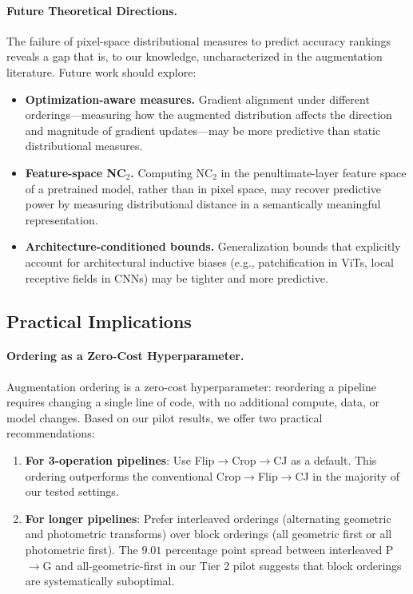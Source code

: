 \documentclass{article}
\begin{document}
\paragraph{Future Theoretical Directions.}
The failure of pixel-space distributional measures to predict accuracy rankings reveals a gap that is, to our knowledge, uncharacterized in the augmentation literature. Future work should explore:
\begin{itemize}
\item \textbf{Optimization-aware measures.} Gradient alignment under different orderings---measuring how the augmented distribution affects the direction and magnitude of gradient updates---may be more predictive than static distributional measures.
\item \textbf{Feature-space NC$_2$.} Computing NC$_2$ in the penultimate-layer feature space of a pretrained model, rather than in pixel space, may recover predictive power by measuring distributional distance in a semantically meaningful representation.
\item \textbf{Architecture-conditioned bounds.} Generalization bounds that explicitly account for architectural inductive biases (e.g., patchification in ViTs, local receptive fields in CNNs) may be tighter and more predictive.
\end{itemize}

\subsection{Practical Implications}

\paragraph{Ordering as a Zero-Cost Hyperparameter.}
Augmentation ordering is a zero-cost hyperparameter: reordering a pipeline requires changing a single line of code, with no additional compute, data, or model changes. Based on our pilot results, we offer two practical recommendations:
\begin{enumerate}
\item \textbf{For 3-operation pipelines}: Use Flip$\to$Crop$\to$CJ as a default. This ordering outperforms the conventional Crop$\to$Flip$\to$CJ in the majority of our tested settings.
\item \textbf{For longer pipelines}: Prefer interleaved orderings (alternating geometric and photometric transforms) over block orderings (all geometric first or all photometric first). The $9.01$ percentage point spread between interleaved P$\to$G and all-geometric-first in our Tier 2 pilot suggests that block orderings are systematically suboptimal.
\end{enumerate}
\end{document}
